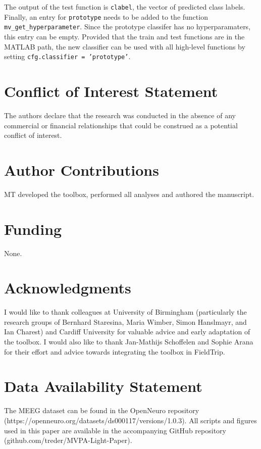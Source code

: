 \documentclass[utf8]{frontiersSCNS} %
\newcommand{\ttt}[1]{\texttt{#1}}
\begin{document}
The output of the test function is \ttt{clabel}, the vector of predicted class labels. Finally, an entry for \ttt{prototype} needs to be added to the function \ttt{mv\_get\_hyperparameter}. Since the prototype classifer has no hyperparamaters, this entry can be empty. Provided that the train and test functions are in the MATLAB path, the new classifier can be used with all high-level functions by setting \ttt{cfg.classifier = 'prototype'}.


\section*{Conflict of Interest Statement}

The authors declare that the research was conducted in the absence of any commercial or financial relationships that could be construed as a potential conflict of interest.

\section*{Author Contributions}

MT developed the toolbox, performed all analyses and authored the manuscript.

\section*{Funding}
None.

\section*{Acknowledgments}
I would like to thank colleagues at University of Birmingham (particularly the research groups of Bernhard Staresina, Maria Wimber, Simon Hanslmayr, and Ian Charest) and Cardiff University for valuable advice and early adaptation of the toolbox. I would also like to thank Jan-Mathijs Schoffelen and Sophie Arana for their effort and advice towards integrating the toolbox in FieldTrip.

\section*{Data Availability Statement}
The MEEG dataset can be found in the OpenNeuro repository (https://openneuro.org/datasets/ds000117/versions/1.0.3). All scripts and figures used in this paper are available in the accompanying GitHub repository (github.com/treder/MVPA-Light-Paper).
\end{document}
